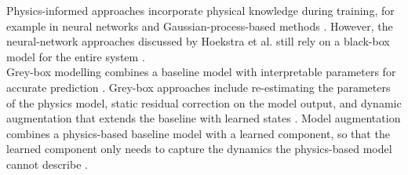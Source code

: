 Physics-informed approaches incorporate physical knowledge during training,
for example in neural networks and Gaussian-process-based methods
\cite{karniadakis2021physicsinformed, raissi2019physicsinformed, willard2020integrating}.
However, the neural-network approaches discussed by Hoekstra et al.
still rely on a black-box model for the entire system
\cite{hoekstra2026lfr}.
%
%
\\
Grey-box modelling combines a baseline model with interpretable parameters
for accurate prediction
\cite{noel2018greybox}.
Grey-box approaches include re-estimating the parameters of the physics model, 
static residual correction on the model output, and dynamic augmentation that 
extends the baseline with learned states \cite{willard2020integrating, hoekstra2026lfr}.
Model augmentation combines a physics-based baseline model with a learned
component, so that the learned component only needs to capture the dynamics
the physics-based model cannot describe \cite{hoekstra2026lfr}.
